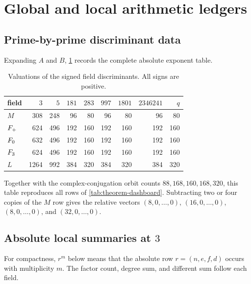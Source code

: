 \section{Global and local arithmetic ledgers}
\label{app:arithmetic-ledgers}

\subsection{Prime-by-prime discriminant data}

Expanding $A$ and $B$, \cref{tab:prime-exponents} records the complete
absolute exponent table.
\begin{table}[htbp]
\centering
\caption{Valuations of the signed field discriminants.  All signs are
positive.}
\label{tab:prime-exponents}
\scriptsize
\begin{tabular}{@{}lrrrrrrrr@{}}
\toprule
field & $3$ & $5$ & $181$ & $283$ & $997$ & $1801$ & $2346241$ & $q$\\
\midrule
$M$ & 308&248&96&80&96&80&96&80\\
$F_{+}$ & 624&496&192&160&192&160&192&160\\
$F_{0}$ & 632&496&192&160&192&160&192&160\\
$F_{3}$ & 624&496&192&160&192&160&192&160\\
$L$ & 1264&992&384&320&384&320&384&320\\
\bottomrule
\end{tabular}
\end{table}
Together with the complex-conjugation orbit counts
$88,168,160,168,320$, this table reproduces all rows of
\cref{tab:theorem-dashboard}.  Subtracting two or four copies of the $M$ row
gives the relative vectors $(8,0,\ldots,0)$,
$(16,0,\ldots,0)$, $(8,0,\ldots,0)$, and
$(32,0,\ldots,0)$.

\subsection{Absolute local summaries at \texorpdfstring{$3$}{3}}

For compactness, $r^m$ below means that the absolute row
$r=(n,e,f,d)$ occurs with multiplicity $m$.  The factor count, degree sum,
and different sum follow each field.

